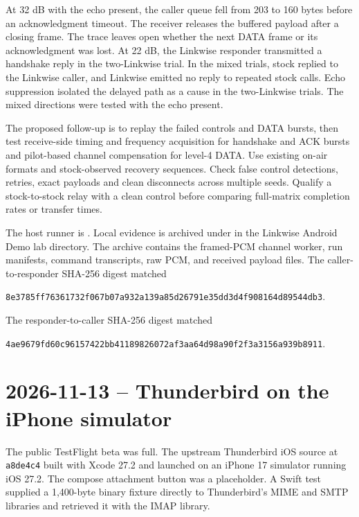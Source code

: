 \documentclass[11pt,a4paper]{article}
\newcommand{\pathtext}[1]{\path{#1}}
\newcommand{\hashtext}[4]{\texttt{\small #1\allowbreak{}#2\allowbreak{}#3\allowbreak{}#4}}
\begin{document}
At 32 dB with the echo present, the caller queue fell from 203 to 160 bytes
before an acknowledgment timeout. The receiver releases the buffered
payload after a closing frame. The trace leaves open whether the next DATA
frame or its acknowledgment was lost. At 22 dB, the Linkwise responder
transmitted a handshake reply in the two-Linkwise trial. In the mixed
trials, stock replied to the Linkwise caller, and Linkwise emitted no
reply to repeated stock calls. Echo suppression isolated the delayed path
as a cause in the two-Linkwise trials. The mixed directions were tested
with the echo present.

The proposed follow-up is to replay the failed controls and DATA bursts,
then test receive-side timing and frequency acquisition for handshake and
ACK bursts and pilot-based channel compensation for level-4 DATA. Use
existing on-air formats and stock-observed recovery sequences. Check false
control detections, retries, exact payloads and clean disconnects across
multiple seeds. Qualify a stock-to-stock relay with a clean control before
comparing full-matrix completion rates or transfer times.

The host runner is \pathtext{tools/test-vara-interop.py}. Local evidence
is archived under \pathtext{vara-hf.xZtPyB/} in the Linkwise Android Demo
lab directory. The archive contains the framed-PCM channel worker, run
manifests, command transcripts, raw PCM, and received payload files.
The caller-to-responder SHA-256 digest matched
\par\noindent
\hashtext{8e3785ff76361732}{f067b07a932a139a}{85d26791e35dd3d4}{f908164d89544db3}.

The responder-to-caller SHA-256 digest matched
\par\noindent
\hashtext{4ae9679fd60c9615}{7422bb4118982607}{2af3aa64d98a90f2}{f3a3156a939b8911}.

\section{2026-11-13 -- Thunderbird on the iPhone simulator}
\label{sec:thunderbird-ios-2026-11-13}

The public TestFlight beta was full. The upstream Thunderbird iOS source
at \texttt{a8de4c4} built with Xcode 27.2 and launched on an iPhone 17
simulator running iOS 27.2. The compose attachment button was a placeholder.
A Swift test supplied a 1,400-byte binary fixture directly to Thunderbird's
MIME and SMTP libraries and retrieved it with the IMAP library.
\end{document}
